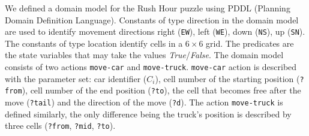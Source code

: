 We defined a domain model for the Rush Hour puzzle using PDDL (Planning Domain Definition Language). Constants of type direction in the domain model are used to identify movement directions right (\texttt{EW}), left (\texttt{WE}), down (\texttt{NS}), up (\texttt{SN}). The constants of type location identify cells in a $6 \times 6$ grid. The predicates are the state variables that may take the values \textit{True}/\textit{False}. The domain model consists of two actions \texttt{move-car} and \texttt{move-truck}. \texttt{move-car} action is described with the parameter set: car identifier ($C_i$), cell number of the starting position (\texttt{?from}), cell number of the end position (\texttt{?to}), the cell that becomes free after the move (\texttt{?tail}) and the direction of the move (\texttt{?d}). The action \texttt{move-truck} is defined similarly, the only difference being the truck's position is described by three cells (\texttt{?from}, \texttt{?mid}, \texttt{?to}). 

